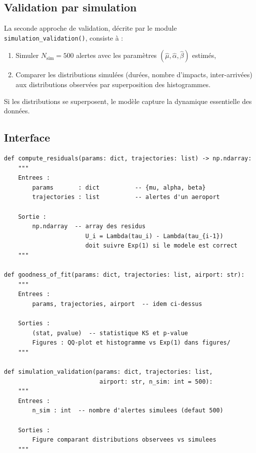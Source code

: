 \documentclass[a4paper,11pt]{article}
\begin{document}
\subsection{Validation par simulation}

La seconde approche de validation, décrite par le module \texttt{simulation\_validation()}, consiste à :
\begin{enumerate}
    \item Simuler $N_{\text{sim}} = 500$ alertes avec les paramètres $(\hat\mu, \hat\alpha, \hat\beta)$ estimés,
    \item Comparer les distributions simulées (durées, nombre d'impacts, inter-arrivées) aux distributions observées par superposition des histogrammes.
\end{enumerate}

Si les distributions se superposent, le modèle capture la dynamique essentielle des données.

\subsection{Interface}

\begin{lstlisting}
def compute_residuals(params: dict, trajectories: list) -> np.ndarray:
    """
    Entrees :
        params       : dict          -- {mu, alpha, beta}
        trajectories : list          -- alertes d'un aeroport

    Sortie :
        np.ndarray  -- array des residus 
                       U_i = Lambda(tau_i) - Lambda(tau_{i-1})
                       doit suivre Exp(1) si le modele est correct
    """

def goodness_of_fit(params: dict, trajectories: list, airport: str):
    """
    Entrees :
        params, trajectories, airport  -- idem ci-dessus

    Sorties :
        (stat, pvalue)  -- statistique KS et p-value
        Figures : QQ-plot et histogramme vs Exp(1) dans figures/
    """

def simulation_validation(params: dict, trajectories: list,
                           airport: str, n_sim: int = 500):
    """
    Entrees :
        n_sim : int  -- nombre d'alertes simulees (defaut 500)

    Sorties :
        Figure comparant distributions observees vs simulees
    """
\end{lstlisting}

\end{document}
